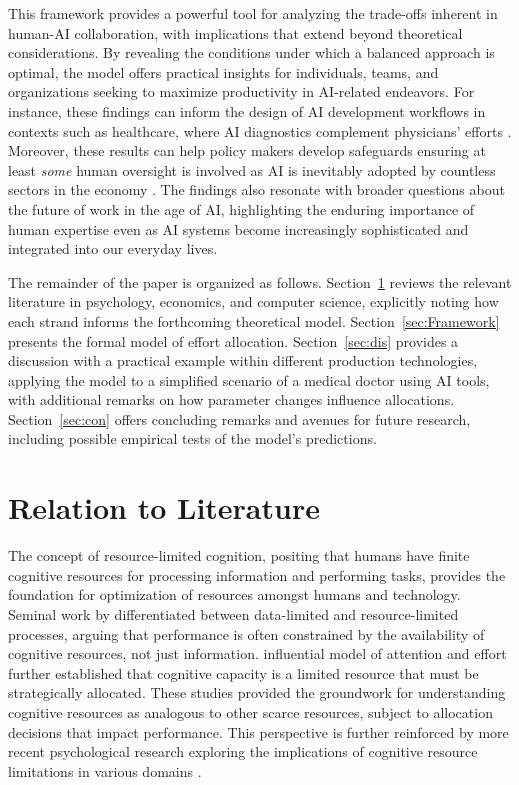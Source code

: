 \documentclass[11pt]{article}
\theoremstyle{definition}
\theoremstyle{remark}
\begin{document}
This framework provides a powerful tool for analyzing the trade-offs inherent in human-AI collaboration, with implications that extend beyond theoretical considerations. By revealing the conditions under which a balanced approach is optimal, the model offers practical insights for individuals, teams, and organizations seeking to maximize productivity in AI-related endeavors. For instance, these findings can inform the design of AI development workflows in contexts such as healthcare, where AI diagnostics complement physicians’ efforts \citep{lammermann2024managing}. Moreover, these results can help policy makers develop safeguards ensuring at least \textit{some} human oversight is involved as AI is inevitably adopted by countless sectors in the economy \citep{agrawal2019economics}. The findings also resonate with broader questions about the future of work in the age of AI, highlighting the enduring importance of human expertise even as AI systems become increasingly sophisticated and integrated into our everyday lives.

The remainder of the paper is organized as follows. Section~\ref{sec:lit} reviews the relevant literature in psychology, economics, and computer science, explicitly noting how each strand informs the forthcoming theoretical model. Section~\ref{sec:Framework} presents the formal model of effort allocation. Section~\ref{sec:dis} provides a discussion with a practical example within different production technologies, applying the model to a simplified scenario of a medical doctor using AI tools, with additional remarks on how parameter changes influence allocations. Section~\ref{sec:con} offers concluding remarks and avenues for future research, including possible empirical tests of the model’s predictions.

\section{Relation to Literature}
\label{sec:lit}
The concept of resource-limited cognition, positing that humans have finite cognitive resources for processing information and performing tasks, provides the foundation for optimization of resources amongst humans and technology. Seminal work by \cite{norman1975data} differentiated between data-limited and resource-limited processes, arguing that performance is often constrained by the availability of cognitive resources, not just information. \cite{kahneman1973attention} influential model of attention and effort further established that cognitive capacity is a limited resource that must be strategically allocated. These studies provided the groundwork for understanding cognitive resources as analogous to other scarce resources, subject to allocation decisions that impact performance. This perspective is further reinforced by more recent psychological research exploring the implications of cognitive resource limitations in various domains \citep{engle2018working}.
\end{document}
